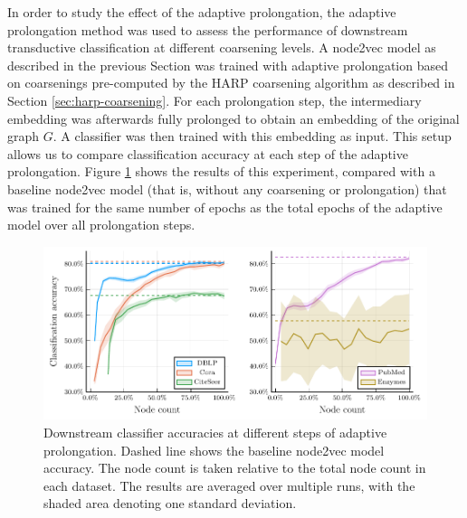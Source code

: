 In order to study the effect of the adaptive prolongation, the adaptive prolongation method was used to assess the performance of downstream transductive classification at different coarsening levels. A node2vec model as described in the previous Section was trained with adaptive prolongation based on coarsenings pre-computed by the HARP coarsening algorithm as described in Section \ref{sec:harp-coarsening}. For each prolongation step, the intermediary embedding was afterwards fully prolonged to obtain an embedding of the original graph \( G \). A classifier was then trained with this embedding as input. This setup allows us to compare classification accuracy at each step of the adaptive prolongation. Figure \ref{fig:adaptive-coarsening} shows the results of this experiment, compared with a baseline node2vec model (that is, without any coarsening or prolongation) that was trained for the same number of epochs as the total epochs of the adaptive model over all prolongation steps.

\begin{figure}
  \centering
  \includegraphics[width = \linewidth]{images/adaptive-coarsening/adaptive-coarsening.pdf}
  \caption{Downstream classifier accuracies at different steps of adaptive prolongation. Dashed line shows the baseline node2vec model accuracy. The node count is taken relative to the total node count in each dataset. The results are averaged over multiple runs, with the shaded area denoting one standard deviation.}
  \label{fig:adaptive-coarsening}
\end{figure}

